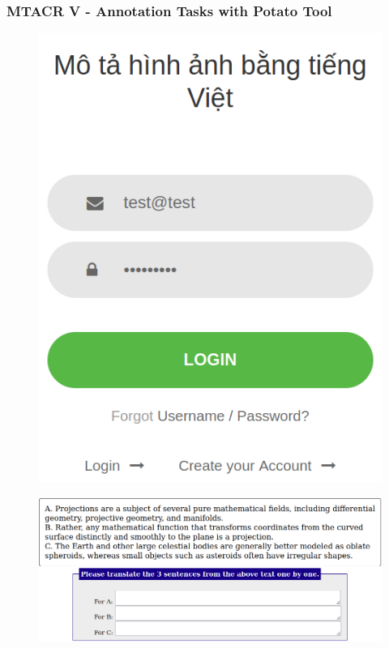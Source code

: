 \documentclass[aspectratio=169]{beamer}
\begin{document}
\begin{frame}[fragile]
	\frametitle{MTACR V - Annotation Tasks with Potato Tool}
    \begin{minipage}{.10\textwidth}
        \centering
        \begin{figure}
            \includegraphics[width=1.0\textwidth]{images/mtacr-potato-login.png} 
        \end{figure}
    \end{minipage}\hfill%
    \begin{minipage}{.45\textwidth}
        \centering
        \begin{figure}
            \includegraphics[width=1.0\textwidth]{images/mtacr-potato-nllb-mfe.png} 

\end{figure}
\end{minipage}
\end{frame}
\end{document}
